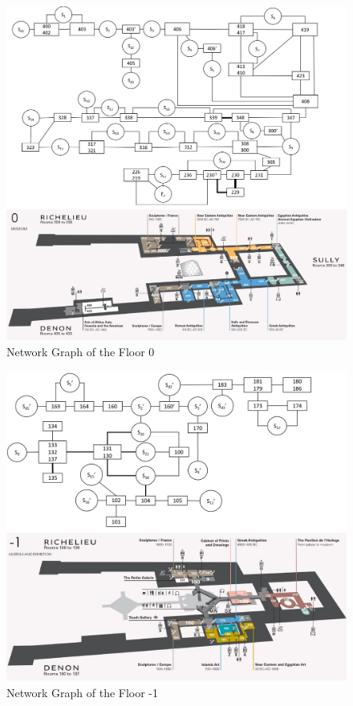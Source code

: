 \documentclass[a4paper,12pt]{article}
\begin{document}
\begin{figure} [H]
\centering
\includegraphics[width=15cm]{floor_0_comp.jpg}
\caption{Network Graph of the Floor 0}
\label{fig5-1}
\end{figure}

\begin{figure} [H]
\centering
\includegraphics[width=15cm]{floor_u1_comp.jpg}
\caption{Network Graph of the Floor -1}
\label{fig5-2}
\end{figure}
\end{document}
